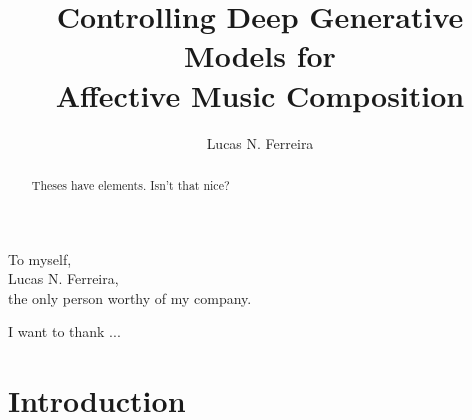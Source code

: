 \documentclass[11pt]{ucscthesis}
\begin{document}

\title{Controlling Deep Generative Models for \\ Affective Music Composition}
\author{Lucas N. Ferreira}
\deanlinethree{}

\begin{frontmatter}

\maketitle
\copyrightpage

\tableofcontents
\listoffigures
\listoftables

\begin{abstract}
Theses have elements.  Isn't that nice?

\end{abstract}

\begin{dedication}
\null\vfil
{\large
\begin{center}
To myself,\\\vspace{12pt}
Lucas N. Ferreira,\\\vspace{12pt}
the only person worthy of my company.
\end{center}}
\vfil\null
\end{dedication}

\begin{acknowledgements}
I want to thank ...
\end{acknowledgements}

\end{frontmatter}


\chapter{Introduction}
\label{ch:intro}

\end{document}
